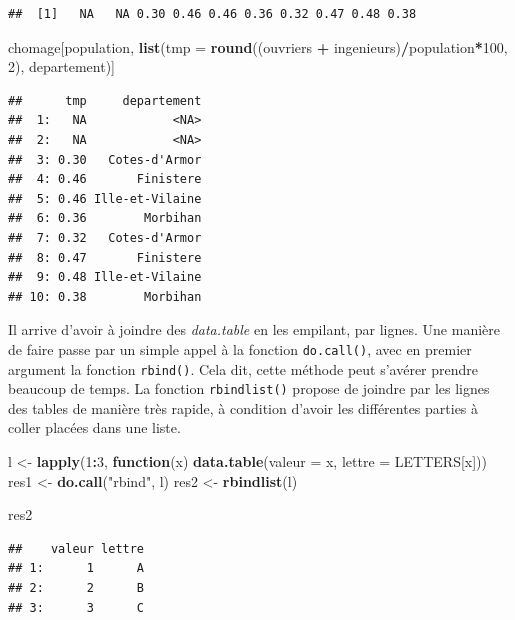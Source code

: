 \documentclass[
  11pt,
]{book}
\newenvironment{Shaded}{\begin{snugshade}}{\end{snugshade}}
\newcommand{\ControlFlowTok}[1]{\textcolor[rgb]{0.13,0.29,0.53}{\textbf{#1}}}
\newcommand{\DataTypeTok}[1]{\textcolor[rgb]{0.13,0.29,0.53}{#1}}
\newcommand{\DecValTok}[1]{\textcolor[rgb]{0.00,0.00,0.81}{#1}}
\newcommand{\KeywordTok}[1]{\textcolor[rgb]{0.13,0.29,0.53}{\textbf{#1}}}
\newcommand{\NormalTok}[1]{#1}
\newcommand{\OperatorTok}[1]{\textcolor[rgb]{0.81,0.36,0.00}{\textbf{#1}}}
\newcommand{\StringTok}[1]{\textcolor[rgb]{0.31,0.60,0.02}{#1}}
\numberwithin{equation}{section}
\numberwithin{countremarque}{section}
\begin{document}
\begin{lstlisting}
##  [1]   NA   NA 0.30 0.46 0.46 0.36 0.32 0.47 0.48 0.38
\end{lstlisting}

\begin{Shaded}
\begin{Highlighting}[]
\NormalTok{chomage[population,}
        \KeywordTok{list}\NormalTok{(}\DataTypeTok{tmp =} \KeywordTok{round}\NormalTok{((ouvriers }\OperatorTok{+}\StringTok{ }\NormalTok{ingenieurs)}\OperatorTok{/}\NormalTok{population}\OperatorTok{*}\DecValTok{100}\NormalTok{, }\DecValTok{2}\NormalTok{), departement)]}
\end{Highlighting}
\end{Shaded}

\begin{lstlisting}
##      tmp     departement
##  1:   NA            <NA>
##  2:   NA            <NA>
##  3: 0.30   Cotes-d'Armor
##  4: 0.46       Finistere
##  5: 0.46 Ille-et-Vilaine
##  6: 0.36        Morbihan
##  7: 0.32   Cotes-d'Armor
##  8: 0.47       Finistere
##  9: 0.48 Ille-et-Vilaine
## 10: 0.38        Morbihan
\end{lstlisting}

Il arrive d'avoir à joindre des \emph{data.table} en les empilant, par lignes. Une manière de faire passe par un simple appel à la fonction \texttt{do.call()}, avec en premier argument la fonction \texttt{rbind()}. Cela dit, cette méthode peut s'avérer prendre beaucoup de temps. La fonction \texttt{rbindlist()} propose de joindre par les lignes des tables de manière très rapide, à condition d'avoir les différentes parties à coller placées dans une liste.

\begin{Shaded}
\begin{Highlighting}[]
\NormalTok{l \textless{}{-}}\StringTok{ }\KeywordTok{lapply}\NormalTok{(}\DecValTok{1}\OperatorTok{:}\DecValTok{3}\NormalTok{, }\ControlFlowTok{function}\NormalTok{(x) }\KeywordTok{data.table}\NormalTok{(}\DataTypeTok{valeur =}\NormalTok{ x, }\DataTypeTok{lettre =}\NormalTok{ LETTERS[x]))}
\NormalTok{res1 \textless{}{-}}\StringTok{ }\KeywordTok{do.call}\NormalTok{(}\StringTok{"rbind"}\NormalTok{, l)}
\NormalTok{res2 \textless{}{-}}\StringTok{ }\KeywordTok{rbindlist}\NormalTok{(l)}

\NormalTok{res2}
\end{Highlighting}
\end{Shaded}

\begin{lstlisting}
##    valeur lettre
## 1:      1      A
## 2:      2      B
## 3:      3      C
\end{lstlisting}
\end{document}
